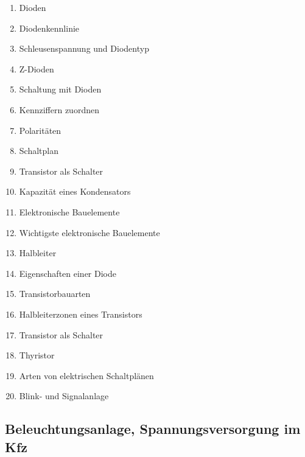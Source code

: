 \begin{enumerate}
\item
  Dioden\\
\item
  Diodenkennlinie\\
\item
  Schleusenspannung und Diodentyp\\
\item
  Z-Dioden\\
\item
  Schaltung mit Dioden\\
\item
  Kennziffern zuordnen\\
\item
  Polaritäten\\
\item
  Schaltplan\\
\item
  Transistor als Schalter\\
\item
  Kapazität eines Kondensators\\
\item
  Elektronische Bauelemente\\
\item
  Wichtigste elektronische Bauelemente\\
\item
  Halbleiter\\
\item
  Eigenschaften einer Diode\\
\item
  Transistorbauarten\\
\item
  Halbleiterzonen eines Transistors\\
\item
  Transistor als Schalter\\
\item
  Thyristor\\
\item
  Arten von elektrischen Schaltplänen\\
\item
  Blink- und Signalanlage
\end{enumerate}

\subsection{Beleuchtungsanlage, Spannungsversorgung im
Kfz}\label{beleuchtungsanlage-spannungsversorgung-im-kfz}

